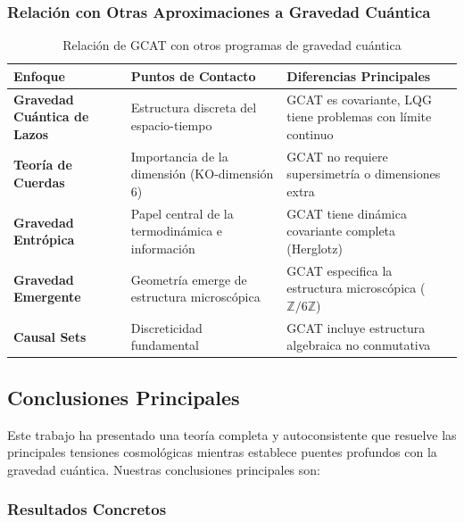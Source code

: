 \documentclass[12pt, a4paper]{article}
\theoremstyle{plain}
\theoremstyle{definition}
\begin{document}
\subsubsection{Relación con Otras Aproximaciones a Gravedad Cuántica}

\begin{table}[h]
\centering
\caption{Relación de GCAT con otros programas de gravedad cuántica}
\label{tab:quantum_gravity_relations}
\begin{tabular}{p{3cm}p{4cm}p{4cm}}
\toprule
\textbf{Enfoque} & \textbf{Puntos de Contacto} & \textbf{Diferencias Principales} \\
\midrule
\textbf{Gravedad Cuántica de Lazos} & Estructura discreta del espacio-tiempo & GCAT es covariante, LQG tiene problemas con límite continuo \\
\textbf{Teoría de Cuerdas} & Importancia de la dimensión (KO-dimensión 6) & GCAT no requiere supersimetría o dimensiones extra \\
\textbf{Gravedad Entrópica} & Papel central de la termodinámica e información & GCAT tiene dinámica covariante completa (Herglotz) \\
\textbf{Gravedad Emergente} & Geometría emerge de estructura microscópica & GCAT especifica la estructura microscópica ($\mathbb{Z}/6\mathbb{Z}$) \\
\textbf{Causal Sets} & Discreticidad fundamental & GCAT incluye estructura algebraica no conmutativa \\
\bottomrule
\end{tabular}
\end{table}

\subsection{Conclusiones Principales}

Este trabajo ha presentado una teoría completa y autoconsistente que resuelve las principales tensiones cosmológicas mientras establece puentes profundos con la gravedad cuántica. Nuestras conclusiones principales son:

\subsubsection{Resultados Concretos}
\end{document}
